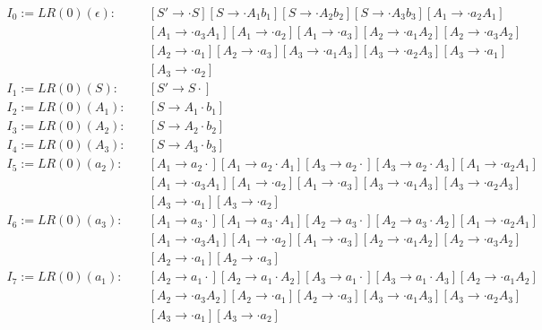 \begin{equation*}
\begin{split}
	I_0 := LR(0)(\epsilon):\quad &[S' \rightarrow \cdot S][S \rightarrow \cdot A_1b_1][S \rightarrow \cdot A_2b_2][S \rightarrow \cdot A_3b_3][A_1 \rightarrow \cdot a_2A_1]\\ 
	&[A_1 \rightarrow \cdot a_3A_1][A_1 \rightarrow \cdot a_2][A_1 \rightarrow \cdot a_3][A_2 \rightarrow \cdot a_1A_2][A_2 \rightarrow \cdot a_3A_2]\\ 
	&[A_2 \rightarrow \cdot a_1][A_2 \rightarrow \cdot a_3][A_3 \rightarrow \cdot a_1A_3][A_3 \rightarrow \cdot a_2A_3][A_3 \rightarrow \cdot a_1]\\
	&[A_3 \rightarrow \cdot a_2]\\
	I_1 := LR(0)(S):\quad &[S' \rightarrow S \cdot]\\
	I_2 := LR(0)(A_1):\quad &[S \rightarrow A_1 \cdot b_1]\\
	I_3 := LR(0)(A_2):\quad &[S \rightarrow A_2 \cdot b_2]\\
	I_4 := LR(0)(A_3):\quad &[S \rightarrow A_3 \cdot b_3]\\
	I_5 := LR(0)(a_2):\quad &[A_1 \rightarrow a_2 \cdot][A_1 \rightarrow a_2 \cdot A_1][A_3 \rightarrow a_2 \cdot][A_3 \rightarrow a_2 \cdot A_3][A_1 \rightarrow \cdot a_2A_1]\\ 
	&[A_1 \rightarrow \cdot a_3A_1][A_1 \rightarrow \cdot a_2][A_1 \rightarrow \cdot a_3][A_3 \rightarrow \cdot a_1A_3][A_3 \rightarrow \cdot a_2A_3]\\ 
	&[A_3 \rightarrow \cdot a_1][A_3 \rightarrow \cdot a_2]\\
	I_6 := LR(0)(a_3):\quad &[A_1 \rightarrow a_3 \cdot][A_1 \rightarrow a_3 \cdot A_1][A_2 \rightarrow a_3 \cdot][A_2 \rightarrow a_3 \cdot A_2][A_1 \rightarrow \cdot a_2A_1]\\ 
	&[A_1 \rightarrow \cdot a_3A_1][A_1 \rightarrow \cdot a_2][A_1 \rightarrow \cdot a_3][A_2 \rightarrow \cdot a_1A_2][A_2 \rightarrow \cdot a_3A_2]\\
	&[A_2 \rightarrow \cdot a_1][A_2 \rightarrow \cdot a_3]\\
	I_7 := LR(0)(a_1):\quad &[A_2 \rightarrow a_1 \cdot][A_2 \rightarrow a_1 \cdot A_2][A_3 \rightarrow a_1 \cdot][A_3 \rightarrow a_1 \cdot A_3][A_2 \rightarrow \cdot a_1A_2]\\ 
	&[A_2 \rightarrow \cdot a_3A_2][A_2 \rightarrow \cdot a_1][A_2 \rightarrow \cdot a_3][A_3 \rightarrow \cdot a_1A_3][A_3 \rightarrow \cdot a_2A_3]\\ 
	&[A_3 \rightarrow \cdot a_1][A_3 \rightarrow \cdot a_2]\\

\end{split}
\end{equation*}
